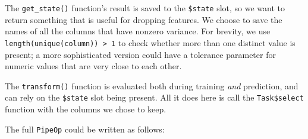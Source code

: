 \documentclass[]{article}
\newenvironment{Shaded}{\begin{snugshade}}{\end{snugshade}}
\newcommand{\ControlFlowTok}[1]{\textcolor[rgb]{0.13,0.29,0.53}{\textbf{#1}}}
\newcommand{\DataTypeTok}[1]{\textcolor[rgb]{0.13,0.29,0.53}{#1}}
\newcommand{\DecValTok}[1]{\textcolor[rgb]{0.00,0.00,0.81}{#1}}
\newcommand{\KeywordTok}[1]{\textcolor[rgb]{0.13,0.29,0.53}{\textbf{#1}}}
\newcommand{\NormalTok}[1]{#1}
\newcommand{\OperatorTok}[1]{\textcolor[rgb]{0.81,0.36,0.00}{\textbf{#1}}}
\newcommand{\StringTok}[1]{\textcolor[rgb]{0.31,0.60,0.02}{#1}}
\renewenvironment{Shaded} {\begin{snugshade}\small} {\end{snugshade}}
\begin{document}
The \texttt{get\_state()} function's result is saved to the \texttt{\$state} slot, so we want to return something that is useful for dropping features.
We choose to save the names of all the columns that have nonzero variance.
For brevity, we use \texttt{length(unique(column))\ \textgreater{}\ 1} to check whether more than one distinct value is present; a more sophisticated version could have a tolerance parameter for numeric values that are very close to each other.

The \texttt{transform()} function is evaluated both during training \emph{and} prediction, and can rely on the \texttt{\$state} slot being present.
All it does here is call the \texttt{Task\$select} function with the columns we chose to keep.

The full \texttt{PipeOp} could be written as follows:

\begin{Shaded}
\end{Shaded}
\end{document}
